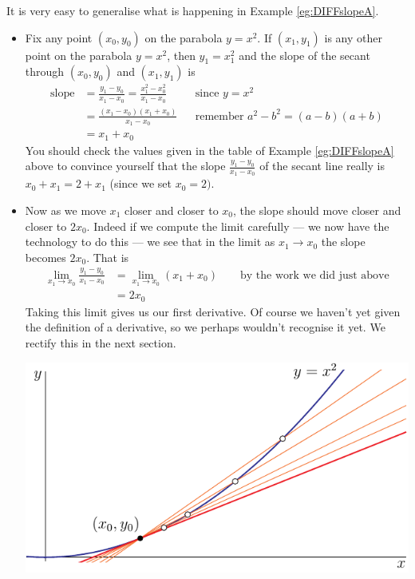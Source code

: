 \begin{eg}\label{eg:DIFFslopeB}
 It is very easy to generalise what is happening in Example \ref{eg:DIFFslopeA}.
\begin{itemize}
 \item Fix any point $(x_0,y_0)$ on the parabola $y=x^2$. If $(x_1,y_1)$ is any other
point on the parabola $y=x^2$, then $y_1=x_1^2$ and the slope of the secant through
$(x_0,y_0)$ and $(x_1,y_1)$ is
\begin{align*}
   \text{slope}
   &= \frac{y_1-y_0}{x_1-x_0}
    =\frac{x_1^2-x_0^2}{x_1-x_0} && \text{since $y=x^2$} \\
  & =\frac{(x_1-x_0)(x_1+x_0)}{x_1-x_0} && \text{remember $a^2-b^2 =
(a-b)(a+b)$}  \\
  & =x_1+x_0
\end{align*}
You should check the values given in the table of Example \ref{eg:DIFFslopeA}
above to convince yourself that the slope $\tfrac{y_1-y_0}{x_1-x_0}$
of the secant line really is $x_0+x_1 = 2+x_1$ (since we set
$x_0=2)$.

\item Now as we move $x_1$ closer and closer to $x_0$, the slope should move
closer and closer to $2x_0$. Indeed if we compute the limit carefully --- we
now have the technology to do this --- we see that in the limit as
$x_1 \to x_0$ the slope becomes $2x_0$.
That is
\begin{align*}
  \lim_{x_1 \to x_0} \frac{y_1-y_0}{x_1-x_0}
  &= \lim_{x_1 \to x_0} (x_1+x_0) \qquad \text{by the work we did just above} \\
  &= 2x_0
\end{align*}
Taking this limit gives us our first derivative. Of course we haven't yet
given the definition of a derivative, so we perhaps wouldn't recognise it yet.
We rectify this in the next section.

\begin{sfig}
   \label{fig:secantToTangent}
   \begin{center}
   \includegraphics{slopeC}


\end{center}
\end{sfig}
\end{itemize}
\end{eg}
